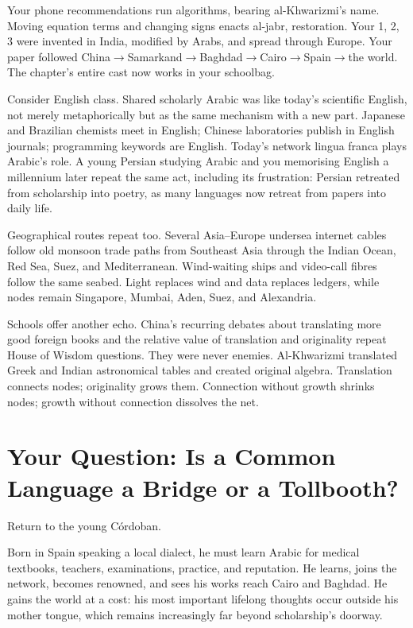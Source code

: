 Your phone recommendations run algorithms, bearing al-Khwarizmi's name. Moving equation terms and changing signs enacts al-jabr, restoration. Your 1, 2, 3 were invented in India, modified by Arabs, and spread through Europe. Your paper followed China$\rightarrow$\allowbreak Samarkand$\rightarrow$\allowbreak Baghdad$\rightarrow$\allowbreak Cairo$\rightarrow$\allowbreak Spain$\rightarrow$\allowbreak the world. The chapter's entire cast now works in your schoolbag.

Consider English class. Shared scholarly Arabic was like today's scientific English, not merely metaphorically but as the same mechanism with a new part. Japanese and Brazilian chemists meet in English; Chinese laboratories publish in English journals; programming keywords are English. Today's network lingua franca plays Arabic's role. A young Persian studying Arabic and you memorising English a millennium later repeat the same act, including its frustration: Persian retreated from scholarship into poetry, as many languages now retreat from papers into daily life.

Geographical routes repeat too. Several Asia--Europe undersea internet cables follow old monsoon trade paths from Southeast Asia through the Indian Ocean, Red Sea, Suez, and Mediterranean. Wind-waiting ships and video-call fibres follow the same seabed. Light replaces wind and data replaces ledgers, while nodes remain Singapore, Mumbai, Aden, Suez, and Alexandria.

Schools offer another echo. China's recurring debates about translating more good foreign books and the relative value of translation and originality repeat House of Wisdom questions. They were never enemies. Al-Khwarizmi translated Greek and Indian astronomical tables and created original algebra. Translation connects nodes; originality grows them. Connection without growth shrinks nodes; growth without connection dissolves the net.

\section[Your Question: Bridge or Tollbooth?]{Your Question: Is a Common Language a Bridge or a Tollbooth?}
Return to the young Córdoban.

Born in Spain speaking a local dialect, he must learn Arabic for medical textbooks, teachers, examinations, practice, and reputation. He learns, joins the network, becomes renowned, and sees his works reach Cairo and Baghdad. He gains the world at a cost: his most important lifelong thoughts occur outside his mother tongue, which remains increasingly far beyond scholarship's doorway.

